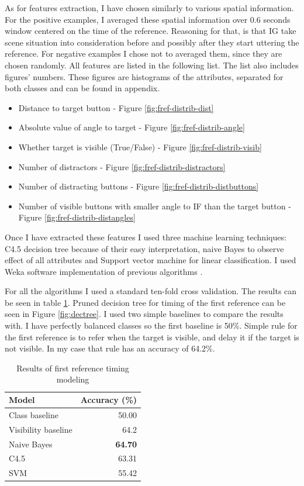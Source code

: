 As for features extraction, I have chosen similarly to \citet{stoia2006sentence} various spatial information. For the positive examples, I averaged these spatial information over 0.6 seconds window centered on the time of the reference. Reasoning for that, is that IG take scene situation into consideration before and possibly after they start uttering the reference. For negative examples I chose not to averaged them, since they are chosen randomly. All features are listed in the following list. The list also includes figures' numbers. These figures are histograms of the attributes, separated for both classes and can be found in appendix.

\begin{itemize}
\item
Distance to target button - Figure \ref{fig:fref-distrib-dist}
\item
Absolute value of angle to target - Figure \ref{fig:fref-distrib-angle}
\item
Whether target is visible (True/False) - Figure \ref{fig:fref-distrib-visib}
\item
Number of distractors - Figure \ref{fig:fref-distrib-distractors}
\item
Number of distracting buttons - Figure \ref{fig:fref-distrib-distbuttons}
\item
Number of visible buttons with smaller angle to IF than the target button - Figure \ref{fig:fref-distrib-distangles}
\end{itemize}

Once I have extracted these features I used three machine learning techniques: C4.5 decision tree because of their easy interpretation, naive Bayes to observe effect of all attributes and Support vector machine for linear classification. I used Weka software implementation of previous algorithms \citep{hall2009weka}.

For all the algorithms I used a standard ten-fold cross validation. The results can be seen in table \ref{tab:firstref}. Pruned decision tree for timing of the first reference can be seen in Figure \ref{fig:dectree}. I used two simple baselines to compare the results with. I have perfectly balanced classes so the first baseline is 50\%. Simple rule for the first reference is to refer when the target is visible, and delay it if the target is not visible. In my case that rule has an accuracy of 64.2\%. 

\begin{table}[!htbp]
 \centering
\begin{tabular}{lr}
\toprule
Model    & Accuracy (\%)  \\
\midrule
Class baseline    & 50.00\\
Visibility baseline & 64.2\\
\midrule
Naive Bayes  & \textbf{64.70} \\
C4.5 & 63.31 \\
SVM & 55.42 \\
\bottomrule
\end{tabular}
\caption{Results of first reference timing modeling}
\label{tab:firstref}
\end{table}

